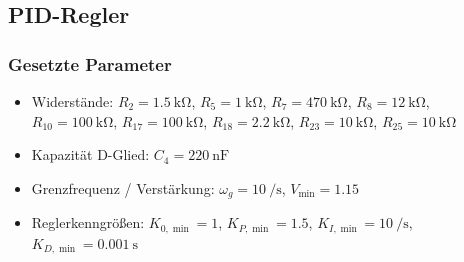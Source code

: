 \subsection{PID-Regler}
\subsubsection*{Gesetzte Parameter}
\begin{itemize}
  \item Widerstände: \(R_2 = \qty{1.5}{\kilo\ohm}\), \(R_5 = \qty{1}{\kilo\ohm}\), \(R_7 = \qty{470}{\kilo\ohm}\), \(R_8 = \qty{12}{\kilo\ohm}\), \(R_{10} = \qty{100}{\kilo\ohm}\), \(R_{17} = \qty{100}{\kilo\ohm}\), \(R_{18} = \qty{2.2}{\kilo\ohm}\), \(R_{23} = \qty{10}{\kilo\ohm}\), \(R_{25} = \qty{10}{\kilo\ohm}\)
  \item Kapazität D-Glied: \(C_4 = \qty{220}{\nano\farad}\)
  \item Grenzfrequenz / Verstärkung: \(\omega_g = \qty{10}{\per\second}\), \(V_{\min} = 1.15\)
  \item Reglerkenngrößen: \(K_{0,\min} = 1\), \(K_{P,\min} = 1.5\), \(K_{I,\min} = \qty{10}{\per\second}\), \(K_{D,\min} = \qty{0.001}{\second}\)
\end{itemize}

